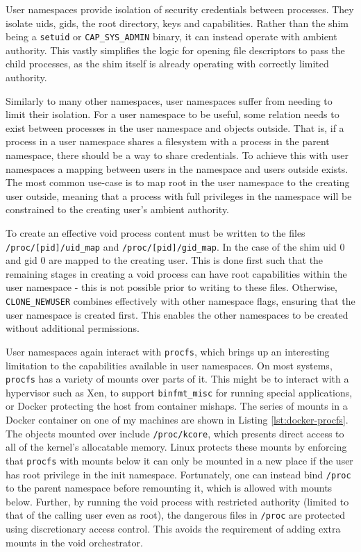 \documentclass[12pt,a4paper,twoside]{report}
\begin{document}
User namespaces provide isolation of security credentials between processes. They isolate uids, gids, the root directory, keys and capabilities. Rather than the shim being a \texttt{setuid} or \texttt{CAP\_SYS\_ADMIN} binary, it can instead operate with ambient authority. This vastly simplifies the logic for opening file descriptors to pass the child processes, as the shim itself is already operating with correctly limited authority.

Similarly to many other namespaces, user namespaces suffer from needing to limit their isolation. For a user namespace to be useful, some relation needs to exist between processes in the user namespace and objects outside. That is, if a process in a user namespace shares a filesystem with a process in the parent namespace, there should be a way to share credentials. To achieve this with user namespaces a mapping between users in the namespace and users outside exists. The most common use-case is to map root in the user namespace to the creating user outside, meaning that a process with full privileges in the namespace will be constrained to the creating user's ambient authority.

To create an effective void process content must be written to the files \texttt{/proc/[pid]/uid\_map} and \texttt{/proc/[pid]/gid\_map}. In the case of the shim uid 0 and gid 0 are mapped to the creating user. This is done first such that the remaining stages in creating a void process can have root capabilities within the user namespace - this is not possible prior to writing to these files. Otherwise, \texttt{CLONE\_NEWUSER} combines effectively with other namespace flags, ensuring that the user namespace is created first. This enables the other namespaces to be created without additional permissions.

User namespaces again interact with \texttt{procfs}, which brings up an interesting limitation to the capabilities available in user namespaces. On most systems, \texttt{procfs} has a variety of mounts over parts of it. This might be to interact with a hypervisor such as Xen, to support \texttt{binfmt\_misc} for running special applications, or Docker protecting the host from container mishaps. The series of mounts in a Docker container on one of my machines are shown in Listing \ref{lst:docker-procfs}. The objects mounted over include \texttt{/proc/kcore}, which presents direct access to all of the kernel's allocatable memory. Linux protects these mounts by enforcing that \texttt{procfs} with mounts below it can only be mounted in a new place if the user has root privilege in the init namespace. Fortunately, one can instead bind \texttt{/proc} to the parent namespace before remounting it, which is allowed with mounts below. Further, by running the void process with restricted authority (limited to that of the calling user even as root), the dangerous files in \texttt{/proc} are protected using discretionary access control. This avoids the requirement of adding extra mounts in the void orchestrator.
\end{document}
